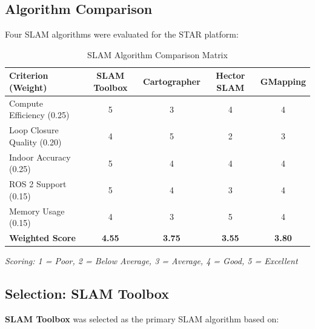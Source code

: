 \documentclass[11pt,letterpaper]{article}
\begin{document}
\subsection{Algorithm Comparison}

Four SLAM algorithms were evaluated for the STAR platform:

\begin{table}[H]
\centering
\caption{SLAM Algorithm Comparison Matrix}
\begin{tabular}{|l|c|c|c|c|}
\hline
\textbf{Criterion (Weight)} & \textbf{SLAM Toolbox} & \textbf{Cartographer} & \textbf{Hector SLAM} & \textbf{GMapping} \\
\hline
Compute Efficiency (0.25) & 5 & 3 & 4 & 4 \\
\hline
Loop Closure Quality (0.20) & 4 & 5 & 2 & 3 \\
\hline
Indoor Accuracy (0.25) & 5 & 4 & 4 & 4 \\
\hline
ROS 2 Support (0.15) & 5 & 4 & 3 & 4 \\
\hline
Memory Usage (0.15) & 4 & 3 & 5 & 4 \\
\hline
\textbf{Weighted Score} & \textbf{4.55} & \textbf{3.75} & \textbf{3.55} & \textbf{3.80} \\
\hline
\end{tabular}
\end{table}

\textit{Scoring: 1 = Poor, 2 = Below Average, 3 = Average, 4 = Good, 5 = Excellent}

\subsection{Selection: SLAM Toolbox}

\textbf{SLAM Toolbox} was selected as the primary SLAM algorithm based on:
\end{document}
